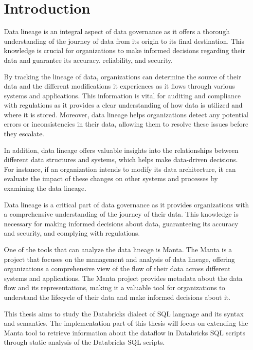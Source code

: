 \chapter{Introduction}

Data lineage is an integral aspect of data governance as it offers a thorough understanding of the journey of data from its origin to its final destination. This knowledge is crucial for organizations to make informed decisions regarding their data and guarantee its accuracy, reliability, and security.

By tracking the lineage of data, organizations can determine the source of their data and the different modifications it experiences as it flows through various systems and applications. This information is vital for auditing and compliance with regulations as it provides a clear understanding of how data is utilized and where it is stored. Moreover, data lineage helps organizations detect any potential errors or inconsistencies in their data, allowing them to resolve these issues before they escalate.

In addition, data lineage offers valuable insights into the relationships between different data structures and systems, which helps make data-driven decisions. For instance, if an organization intends to modify its data architecture, it can evaluate the impact of these changes on other systems and processes by examining the data lineage.

Data lineage is a critical part of data governance as it provides organizations with a comprehensive understanding of the journey of their data. This knowledge is necessary for making informed decisions about data, guaranteeing its accuracy and security, and complying with regulations.

One of the tools that can analyze the data lineage is Manta. The Manta is a project that focuses on the management and analysis of data lineage, offering organizations a comprehensive view of the flow of their data across different systems and applications. The Manta project provides metadata about the data flow and its representations, making it a valuable tool for organizations to understand the lifecycle of their data and make informed decisions about it.

This thesis aims to study the Databricks dialect of SQL language and its syntax and semantics. The implementation part of this thesis will focus on extending the Manta tool to retrieve information about the dataflow in Databricks SQL scripts through static analysis of the Databricks SQL scripts. 

